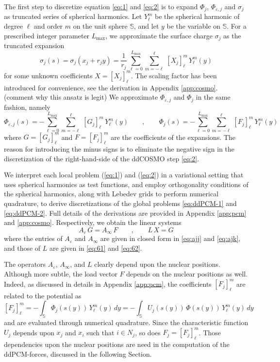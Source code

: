 The first step to discretize equation \eqref{eq:1} and \eqref{eq:2} is to expand $\Phi_j$, $\Phi_{\varepsilon,j}$ and $\sigma_j$ as truncated series of spherical harmonics. Let $Y_\ell^m$ be the spherical harmonic of degree $\ell$ and order $m$ on the unit sphere $\mathbb{S}$, and let $y$ be the variable on $\mathbb{S}$. For a prescribed integer parameter ${L_\text{max}}$,  we approximate the surface charge $\sigma_j$ as the truncated expansion
\[
\sigma_j(s) = \sigma_j(x_j + r_j y) = \frac{1}{r_j} \, \sum_{\ell=0}^{L_\text{max}} \sum_{m = -\ell}^\ell \, [X_j]_\ell^m \, Y_\ell^m(y)
\]
for some unknown coefficients $X = [X_j]_\ell^m$. The scaling factor has been introduced for convenience, see the derivation in Appendix \ref{app:cosmo}. {\color{red} (comment why this ansatz is legit)} We approximate $\Phi_{\varepsilon,j}$ and $\Phi_j$ in the same fashion, namely
\[
\Phi_{\varepsilon,j}(s) = - \sum_{\ell=0}^{L_\text{max}} \sum_{m = -\ell}^\ell \, [G_j]_\ell^m \, Y_\ell^m(y) \qquad , \qquad \Phi_j(s) = -\sum_{\ell=0}^{L_\text{max}} \sum_{m = -\ell}^\ell \, [F_j]_\ell^m \, Y_\ell^m(y)
\]
where $G = [G_j]_\ell^m$ and $F = [F_j]_\ell^m$ are the coefficients of the expansions. The reason for introducing the minus signs is to eliminate the negative sign in the discretization of the right-hand-side of the ddCOSMO step \eqref{eq:2}. 


We interpret each local problem (\ref{eq:1}) and (\ref{eq:2}) in a variational setting that uses spherical harmonics as test functions, and employ orthogonality conditions of the spherical harmonics, along with Lebedev grids to perform numerical quadrature, to derive discretizations of the global problems \eqref{eq:ddPCM-1} and \eqref{eq:ddPCM-2}. Full details of the derivations are provided in Appendix \ref{app:pcm} and \ref{app:cosmo}. Respectively, we obtain the linear systems
\begin{equation}\label{eq:6}
A_\varepsilon \, G = A_\infty \, F \qquad , \qquad  L \, X = G
\end{equation}
where the entries of $A_\varepsilon$ and $A_\infty$ are given in closed form in \eqref{eq:ajj} and \eqref{eq:ajk}, and those of $L$ are given in \eqref{eq:61} and \eqref{eq:62}.

The operators $A_\varepsilon$, $A_\infty$, and $L$ clearly depend upon the nuclear positions. Although more subtle, the load vector $F$ depends on the nuclear positions as well. Indeed, as discussed in details in Appendix \ref{app:pcm}, the coefficients $[F_j]_\ell^m$ are related to the potential as
\begin{equation}\label{eq:25}
[F_j]_\ell^m = - \int_{\mathbb{S}} \Phi_j(s(y)) \, Y_\ell^m(y) \,dy = - \int_{\mathbb{S}} U_j(s(y)) \, \Phi(s(y)) \, Y_\ell^m(y) \,dy
\end{equation}
and are evaluated through numerical quadrature. Since the characteristic function $U_j$ depends upon $x_j$ and $x_i$ such that $i \in N_j$, so does $F_j = [F_j]_\ell^m$. Those dependencies upon the nuclear positions are need in the computation of the ddPCM-forces, discussed in the following Section.


